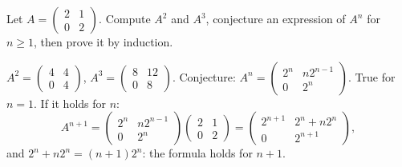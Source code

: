 \begin{exercise}
Let $A=\begin{pmatrix}2&1\\0&2\end{pmatrix}$. Compute $A^2$ and $A^3$, conjecture an expression of $A^n$ for $n\ge1$, then prove it by induction.
\end{exercise}
\begin{solution}
$A^2=\begin{pmatrix}4&4\\0&4\end{pmatrix}$, $A^3=\begin{pmatrix}8&12\\0&8\end{pmatrix}$. Conjecture: $A^n=\begin{pmatrix}2^n&n2^{n-1}\\0&2^n\end{pmatrix}$. True for $n=1$. If it holds for $n$:
\[A^{n+1}=\begin{pmatrix}2^n&n2^{n-1}\\0&2^n\end{pmatrix}\begin{pmatrix}2&1\\0&2\end{pmatrix}=\begin{pmatrix}2^{n+1}&2^n+n2^n\\0&2^{n+1}\end{pmatrix},\]
and $2^n+n2^n=(n+1)2^n$: the formula holds for $n+1$.
\end{solution}

